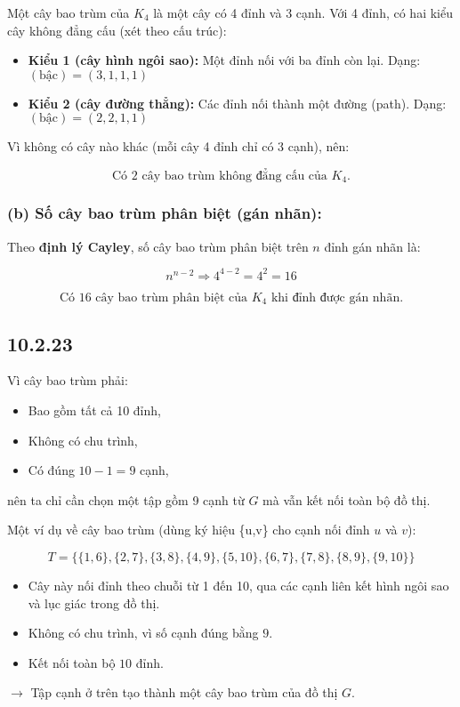 \documentclass{article}
\begin{document}
	Một cây bao trùm của $K_4$ là một cây có 4 đỉnh và 3 cạnh.  
	Với 4 đỉnh, có hai kiểu cây không đẳng cấu (xét theo cấu trúc):
	
	\begin{itemize}
		\item \textbf{Kiểu 1 (cây hình ngôi sao):} Một đỉnh nối với ba đỉnh còn lại.  
		Dạng: $(\text{bậc}) = (3,1,1,1)$
		
		\item \textbf{Kiểu 2 (cây đường thẳng):} Các đỉnh nối thành một đường (path).  
		Dạng: $(\text{bậc}) = (2,2,1,1)$
	\end{itemize}
	
	Vì không có cây nào khác (mỗi cây 4 đỉnh chỉ có 3 cạnh), nên:
	
	\[
	\boxed{\text{Có 2 cây bao trùm không đẳng cấu của } K_4.}
	\]
	
	\subsubsection*{(b) Số cây bao trùm phân biệt (gán nhãn):}
	
	Theo \textbf{định lý Cayley}, số cây bao trùm phân biệt trên $n$ đỉnh gán nhãn là:
	
	\[
	n^{n - 2}
	\Rightarrow 4^{4 - 2} = 4^2 = 16
	\]
	
	\[
	\boxed{\text{Có 16 cây bao trùm phân biệt của } K_4 \text{ khi đỉnh được gán nhãn.}}
	\]
	
	\subsection*{10.2.23}
	Vì cây bao trùm phải:
	\begin{itemize}
		\item Bao gồm tất cả 10 đỉnh,
		\item Không có chu trình,
		\item Có đúng $10 - 1 = 9$ cạnh,
	\end{itemize}
	nên ta chỉ cần chọn một tập gồm 9 cạnh từ $G$ mà vẫn kết nối toàn bộ đồ thị.
	
	Một ví dụ về cây bao trùm (dùng ký hiệu \{u,v\} cho cạnh nối đỉnh $u$ và $v$):
	
	\[
	T = \{\{1,6\}, \{2,7\}, \{3,8\}, \{4,9\}, \{5,10\}, \{6,7\}, \{7,8\}, \{8,9\}, \{9,10\}\}
	\]
	
	\begin{itemize}
		\item Cây này nối đỉnh theo chuỗi từ 1 đến 10, qua các cạnh liên kết hình ngôi sao và lục giác trong đồ thị.
		\item Không có chu trình, vì số cạnh đúng bằng $9$.
		\item Kết nối toàn bộ $10$ đỉnh.
	\end{itemize}
	$\rightarrow$ Tập cạnh ở trên tạo thành một cây bao trùm của đồ thị $G$.
	
\end{document}
